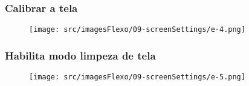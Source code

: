 \newpage
\thispagestyle{fancy}
\vspace*{40 pt}
\subsubsection{\small{Calibrar a tela}}\label{telaConfiguracoesDoEcrãCalibrarATela}
\vspace*{\fill}
\begin{figure}[h]
  \centering
  \texttt{[image: src/imagesFlexo/09-screenSettings/e-4.png]}
\end{figure}
\vspace*{\fill}

\newpage
\thispagestyle{fancy}
\vspace*{40 pt}
\subsubsection{\small{Habilita modo limpeza de tela}}\label{telaConfiguracoesDoEcrãHabilitaModoLimpezaDeTela}
\vspace*{\fill}
\begin{figure}[h]
  \centering
  \texttt{[image: src/imagesFlexo/09-screenSettings/e-5.png]}
\end{figure}
\vspace*{\fill}